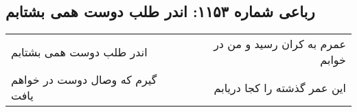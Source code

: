 \begin{center}
\section*{رباعی شماره ۱۱۵۳: اندر طلب دوست همی بشتابم}
\label{sec:1153}
\begin{longtable}{l p{0.5cm} r}
اندر طلب دوست همی بشتابم
&&
عمرم به کران رسید و من در خوابم
\\
گیرم که وصال دوست در خواهم یافت
&&
این عمر گذشته را کجا دریابم
\\
\end{longtable}
\end{center}
